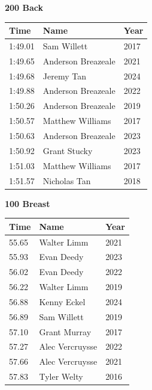 \begin{minipage}[t]{0.48\textwidth}
\centering
\textbf{\textcolor{teamprimary}{200 Back}}\par
\vspace{0.5em}
\centering
\small
\renewcommand{\arraystretch}{1.0}
\setlength{\tabcolsep}{4pt}
\begin{tabular}{@{}p{1.8cm}p{3.0cm}p{1.0cm}@{}}
\toprule
\textbf{Time} & \textbf{Name} & \textbf{Year} \\
\midrule
1:49.01 & Sam Willett & 2017 \\
1:49.65 & Anderson Breazeale & 2021 \\
1:49.68 & Jeremy Tan & 2024 \\
1:49.88 & Anderson Breazeale & 2022 \\
1:50.26 & Anderson Breazeale & 2019 \\
1:50.57 & Matthew Williams & 2017 \\
1:50.63 & Anderson Breazeale & 2023 \\
1:50.92 & Grant Stucky & 2023 \\
1:51.03 & Matthew Williams & 2017 \\
1:51.57 & Nicholas Tan & 2018 \\
\bottomrule
\end{tabular}
\end{minipage}
\vspace{1.2em}
\noindent\begin{minipage}[t]{0.48\textwidth}
\centering
\textbf{\textcolor{teamprimary}{100 Breast}}\par
\vspace{0.5em}
\centering
\small
\renewcommand{\arraystretch}{1.0}
\setlength{\tabcolsep}{4pt}
\begin{tabular}{@{}p{1.8cm}p{3.0cm}p{1.0cm}@{}}
\toprule
\textbf{Time} & \textbf{Name} & \textbf{Year} \\
\midrule
55.65 & Walter Limm & 2021 \\
55.93 & Evan Deedy & 2023 \\
56.02 & Evan Deedy & 2022 \\
56.22 & Walter Limm & 2019 \\
56.88 & Kenny Eckel & 2024 \\
56.89 & Sam Willett & 2019 \\
57.10 & Grant Murray & 2017 \\
57.27 & Alec Vercruysse & 2022 \\
57.66 & Alec Vercruysse & 2021 \\
57.83 & Tyler Welty & 2016 \\
\bottomrule
\end{tabular}
\end{minipage}
